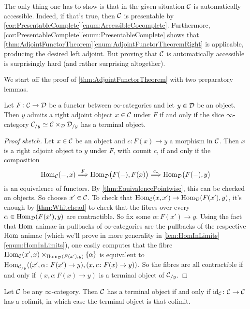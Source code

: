 The only thing one has to show is that in the given situation $\mathcal{C}$ is automatically accessible. Indeed, if that's true, then $\mathcal{C}$ is presentable by \cref{cor:PresentableComplete}\cref{enum:AccessibleCocomplete}. Furthermore, \cref{cor:PresentableComplete}\cref{enum:PresentableComplete} shows that \cref{thm:AdjointFunctorTheorem}\cref{enum:AdjointFunctorTheoremRight} is applicable, producing the desired left adjoint. But proving that $\mathcal{C}$ is automatically accessible is surprisingly hard (and rather surprising altogether).


We start off the proof of \cref{thm:AdjointFunctorTheorem} with two preparatory lemmas.
\begin{lem}\label{lem:TerminalInSlice}
	Let $F\colon \mathcal{C}\rightarrow\mathcal{D}$ be a functor between $\infty$-categories and let $y\in\mathcal{D}$ be an object. Then $y$ admits a right adjoint object $x\in\mathcal{C}$ under $F$ if and only if the slice $\infty$-category $\mathcal{C}_{/y}\simeq \mathcal{C}\times_{\mathcal{D}}\mathcal{D}_{/y}$ has a terminal object.
\end{lem}
\begin{proof}[Proof sketch]
	Let $x\in \mathcal{C}$ be an object and $c\colon F(x)\rightarrow y$ a morphism in $\mathcal{C}$. Then $x$ is a right adjoint object to $y$ under $F$, with counit $c$, if and only if the composition
	\begin{equation*}
		\operatorname{Hom}_{\mathcal{C}}(-,x)\overset{F}{\Longrightarrow} \operatorname{Hom}_{\mathcal{D}}\bigl(F(-),F(x)\bigr)\overset{c_*}{\Longrightarrow}\operatorname{Hom}_{\mathcal{D}}\bigl(F(-),y\bigr)
	\end{equation*}
	is an equivalence of functors. By \cref{thm:EquivalencePointwise}, this can be checked on objects. So choose $x'\in\mathcal{C}$. To check that $\operatorname{Hom}_{\mathcal{C}}(x,x')\rightarrow \operatorname{Hom}_{\mathcal{D}}(F(x'),y)$, it's enough by \cref{thm:Whitehead} to check that the fibres over every $\alpha\in\operatorname{Hom}_{\mathcal{D}}(F(x'),y)$ are contractible. So fix some $\alpha\colon F(x')\rightarrow y$. Using the fact that $\operatorname{Hom}$ animae in pullbacks of $\infty$-categories are the pullbacks of the respective $\operatorname{Hom}$ animae (which we'll prove in more generality in \cref{lem:HomInLimits}\cref{enum:HomInLimits}), one easily computes that the fibre $\operatorname{Hom}_{\mathcal{C}}(x',x)\times_{\operatorname{Hom}_{\mathcal{D}}(F(x'),y)}\{\alpha\}$ is equivalent to $\operatorname{Hom}_{\mathcal{C}_{/y}}((x',\alpha\colon F(x')\rightarrow y),(x,c\colon F(x)\rightarrow y))$. So the fibres are all contractible if and only if $(x,c\colon F(x)\rightarrow y)$ is a terminal object of $\mathcal{C}_{/y}$.
\end{proof}
\begin{lem}\label{lem:TerminalObjectColimit}
	Let $\mathcal{C}$ be any  $\infty$-category. Then $\mathcal{C}$ has a terminal object if and only if $\operatorname{id}_{\mathcal{C}}\colon \mathcal{C}\rightarrow\mathcal{C}$ has a colimit, in which case the terminal object is that colimit.
\end{lem}
